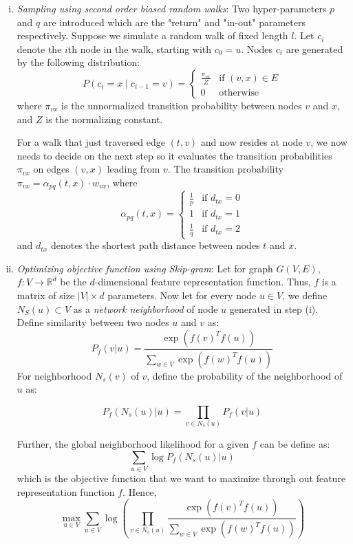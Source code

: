 \documentclass[conference]{IEEEtran}
\begin{document}
\begin{enumerate}[(i)]
    \item \textit{Sampling using second order biased random walks}: Two hyper-parameters \( p \) and \( q \) are introduced which are the "return" and "in-out" parameters respectively. Suppose we simulate a random walk of fixed length \( l \). Let \( c_i \) denote the \( i \)th node in the walk, starting with \( c_0 = u \). Nodes \( c_i \) are generated by the following distribution:
    \[
        P(c_i = x \mid c_{i-1} = v) =
        \begin{cases}
        \frac{\pi_{vx}}{Z} & \text{if } (v,x) \in E \\
        0 & \text{otherwise}
        \end{cases}
    \]
    where \( \pi_{vx} \) is the unnormalized transition probability between nodes \( v \) and \( x \), and \( Z \) is the normalizing constant.
    
    For a walk that just traversed edge \( (t,v) \) and now resides at node \( v \), we now needs to decide on the next step so it evaluates the transition probabilities \( \pi_{vx} \) on edges \( (v,x) \) leading from \( v \). The transition probability \( \pi_{vx} = \alpha_{pq}(t,x)\cdot w_{vx} \), where 
    \[
        \alpha_{pq}(t,x) = 
        \begin{cases}
        \frac{1}{p}  & \text{if } d_{tx} = 0\\
        1 & \text{if } d_{tx} = 1\\
        \frac{1}{q} & \text{if } d_{tx} = 2
        \end{cases}
    \]
    and \( d_{tx} \) denotes the shortest path distance between nodes \( t \) and \( x \).

    \item \textit{Optimizing objective function using Skip-gram}: Let for graph \( G(V, E) \), \( f: V \rightarrow \mathbb{R}^d \) be the \( d \)-dimensional feature representation function. Thus, \( f \) is a matrix of size \( |V| \times d \) parameters. Now let for every node \( u \in V \), we define \( N_S(u) \subset V \) as a \emph{network neighborhood} of node \( u \) generated in step (i). Define similarity between two nodes \( u \) and \( v \) as:
    \[
        P_f(v|u) = \frac{\exp(f(v)^T f(u))}{\sum_{w \in V} \exp(f(w)^T f(u))} \tag{1}
    \]
    For neighborhood \( N_s(v) \) of \( v \), define the probability of the neighborhood of \( u \) as:
    
    \[ P_f(N_s(u)|u) = \prod_{v \in N_s(u)} P_f(v|u) \tag{2} \]

    Further, the global neighborhood likelihood for a given \( f \) can be define as:
    \[ \sum_{u \in V} \log P_f(N_s(u)|u) \tag{3}\]
    which is the objective function that we want to maximize through out feature representation function \(f\). Hence,
     \[
    \max_{u \in V} \sum_{u \in V} \log \left( \prod_{v \in N_s(u)} \frac{\exp(f(v)^T f(u))}{\sum_{w \in V} \exp(f(w)^T f(u))} \right) \tag{4}
    \]
\end{enumerate}
\end{document}
